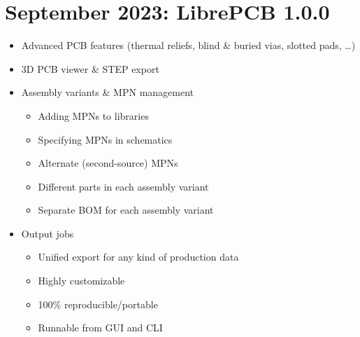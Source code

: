 \section{September 2023: LibrePCB 1.0.0}

\begin{frame}{\secname}
  \begin{itemize}
    \item<1-> Advanced PCB features (thermal reliefs, blind \& buried vias, slotted pads, \ldots)
    \item<2-> 3D PCB viewer \& STEP export
    \item<3-> Assembly variants \& MPN management
      \begin{itemize}
        \item Adding MPNs to libraries
        \item Specifying MPNs in schematics
        \item Alternate (second-source) MPNs
        \item Different parts in each assembly variant
        \item Separate BOM for each assembly variant
      \end{itemize}
    \item<4-> Output jobs
      \begin{itemize}
        \item Unified export for any kind of production data
        \item Highly customizable
        \item 100\% reproducible/portable
        \item Runnable from GUI and CLI
      \end{itemize}
  \end{itemize}

\end{frame}
